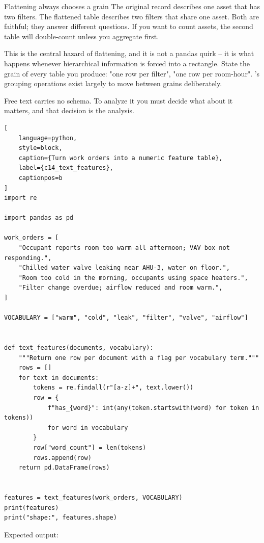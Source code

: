 \begin{ExplainBox}{Flattening always chooses a grain}
The original record describes one asset that has two filters. The flattened
table describes two filters that share one asset. Both are faithful; they answer
different questions. If you want to count assets, the second table will
double-count unless you aggregate first.

This is the central hazard of flattening, and it is not a pandas quirk -- it is
what happens whenever hierarchical information is forced into a rectangle. State
the grain of every table you produce: "one row per filter", "one row per
room-hour". 's grouping operations exist largely to move
between grains deliberately.
\end{ExplainBox}


Free text carries no schema. To analyze it you must decide what about it
matters, and that decision is the analysis.

\begin{lstlisting}[
    language=python,
    style=block,
    caption={Turn work orders into a numeric feature table},
    label={c14_text_features},
    captionpos=b
]
import re

import pandas as pd

work_orders = [
    "Occupant reports room too warm all afternoon; VAV box not responding.",
    "Chilled water valve leaking near AHU-3, water on floor.",
    "Room too cold in the morning, occupants using space heaters.",
    "Filter change overdue; airflow reduced and room warm.",
]

VOCABULARY = ["warm", "cold", "leak", "filter", "valve", "airflow"]


def text_features(documents, vocabulary):
    """Return one row per document with a flag per vocabulary term."""
    rows = []
    for text in documents:
        tokens = re.findall(r"[a-z]+", text.lower())
        row = {
            f"has_{word}": int(any(token.startswith(word) for token in tokens))
            for word in vocabulary
        }
        row["word_count"] = len(tokens)
        rows.append(row)
    return pd.DataFrame(rows)


features = text_features(work_orders, VOCABULARY)
print(features)
print("shape:", features.shape)
\end{lstlisting}

Expected output:

